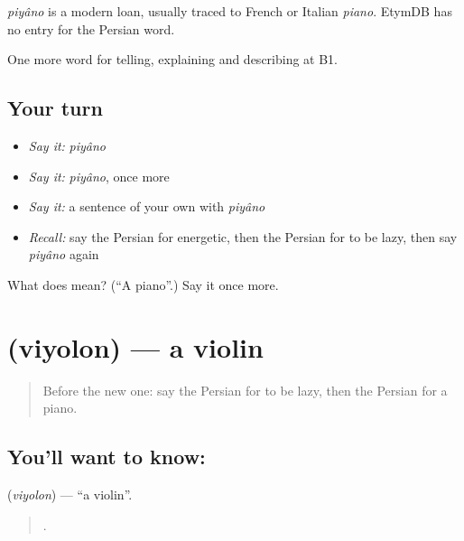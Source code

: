 \begin{cousinweb}
\emph{piyâno} is a modern loan, usually traced to French or Italian \emph{piano}. EtymDB has no entry for the Persian word.
\end{cousinweb}

\begin{grammarlens}[title={What you've built}]
One more word for telling, explaining and describing at B1.
\end{grammarlens}

\subsection*{Your turn}
\begin{itemize}
\raggedright
  \item \emph{Say it:} \emph{piyâno}
  \item \emph{Say it:} \emph{piyâno}, once more
  \item \emph{Say it:} a sentence of your own with \emph{piyâno}
  \item \emph{Recall:} say the Persian for energetic, then the Persian for to be lazy, then say \emph{piyâno} again
\end{itemize}

\begin{tcolorbox}[breakable,colback=teal!4,colframe=teal!35!black,title={Before you move on}]
What does  mean? (\textquotedblleft{}A piano\textquotedblright{}.) Say it once more.
\end{tcolorbox}
\section[\texorpdfstring{\fa{ویولن} (viyolon)}{ویولن (viyolon)}]{ (viyolon) — a violin}

\label{lesson:FA-C517-viyolon}



\begin{quote}
Before the new one: say the Persian for to be lazy, then the Persian for a piano.
\end{quote}

\subsection*{You'll want to know: }
\textbf{} (\emph{viyolon}) — \textquotedblleft{}a violin\textquotedblright{}.

\begin{quote}
    .
\end{quote}

